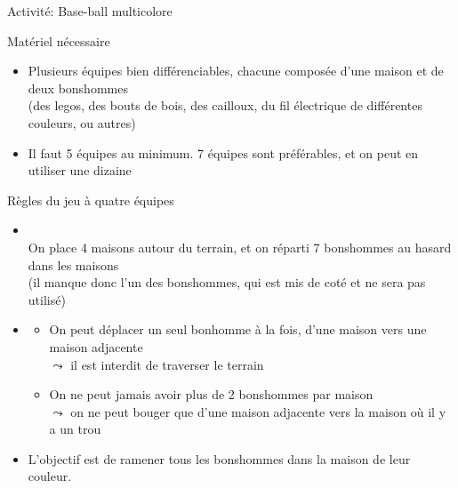 \documentclass[final,hyperref={pdfpagelabels=false}]{beamer}
\renewcommand*{\normalsize}{\fontsize{\resultnormalsizeX}{\resultnormalsizeY}\selectfont}
\begin{document}
\begin{frame}{Activité: Base-ball multicolore}
  \begin{block}{Matériel nécessaire}
    \begin{itemize}
    \item Plusieurs équipes bien différenciables, chacune composée d'une maison
      et de deux bonshommes\\
      (des legos, des bouts de bois, des cailloux, du fil électrique de
      différentes couleurs, ou autres)
      
    \item Il faut 5 équipes au minimum. 7 équipes sont préférables, et on peut
      en utiliser une dizaine
    \end{itemize}
  \end{block}

  \begin{block}{Règles du jeu à quatre équipes}
    \begin{itemize}
    \item {}~\\
      On place 4 maisons autour du terrain, et on réparti 7 bonshommes au
      hasard dans les maisons\\
     (il manque donc l'un des bonshommes, qui est mis de coté et ne sera
      pas utilisé)
    \item {}
      \begin{itemize}\normalsize
      \item On peut déplacer un seul bonhomme à la fois, d'une maison vers une
        maison adjacente\\
        $\leadsto$ il est interdit de traverser le terrain
      \item On ne peut jamais avoir plus de 2 bonshommes par maison\\
        $\leadsto$ on ne peut bouger que d'une maison adjacente vers la maison
        où il y a un trou
      \end{itemize}
    \item  {}
      L'objectif est de ramener tous les bonshommes dans la maison de leur couleur.
    \end{itemize}
  \end{block}

  \vspace{-\baselineskip}
  \begin{columns}
    \begin{column}{.17\linewidth}\center
       {}


\end{column}
\end{columns}
\end{frame}
\end{document}
